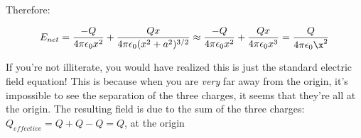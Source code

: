 \begin{solution}
Therefore:

\begin{equation*}
    E_{net} = \frac{-Q}{4\pi\epsilon_0x^2} +
              \frac{Qx}{4\pi\epsilon_0(x^2+a^2)^{3/2}}
            \approx
              \frac{-Q}{4\pi\epsilon_0x^2} +
              \frac{Qx}{4\pi\epsilon_0x^3}
            =
              \frac{Q}{4\pi\epsilon_0\x^2}
\end{equation*}

If you're not illiterate, you would have realized this is just the standard electric field equation! This is because when you are \emph{very} far away from the origin, it's impossible to see the separation of the three charges, it seems that they're all at the origin. The resulting field is due to the sum of the three charges: $Q_{effective}=Q+Q-Q=Q$, at the origin

\end{solution}


